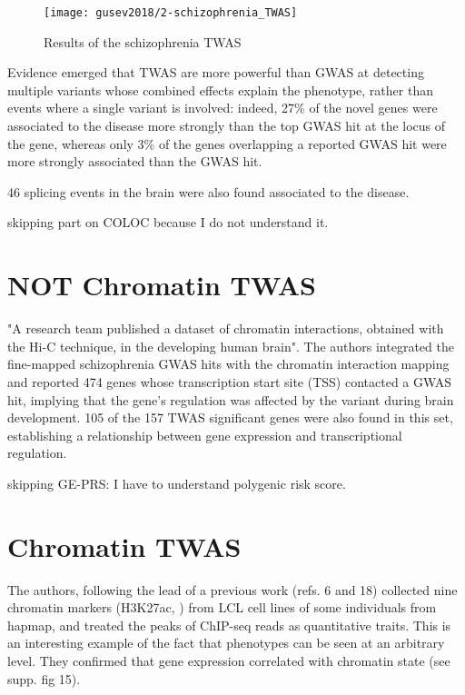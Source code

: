 \documentclass[../main.tex]{subfiles}
\begin{document}
\begin{figure}
	\texttt{[image: gusev2018/2-schizophrenia\_TWAS]}
	\caption{Results of the schizophrenia TWAS}
\end{figure}

Evidence emerged that TWAS are more powerful than GWAS at detecting 
multiple variants whose combined effects explain the phenotype, rather 
than events where a single variant is involved: indeed, 27\% of the 
novel genes were associated to the disease more strongly than the top 
GWAS hit at the locus of the gene, whereas only 3\% of the genes 
overlapping a reported GWAS hit were more strongly associated than the 
GWAS hit.

46 splicing events in the brain were also found associated to the 
   disease.

skipping part on COLOC because I do not understand it.

\section{NOT Chromatin TWAS}

"A research team published a dataset of chromatin interactions, obtained 
with the Hi-C technique, in the developing human brain". The authors 
integrated the fine-mapped schizophrenia GWAS hits with the chromatin 
interaction mapping and reported 474 genes whose transcription start 
site (TSS) contacted a GWAS hit, implying that the gene's regulation was 
affected by the variant during brain development. 105 of the 157 TWAS 
significant genes were also found in this set, establishing a 
relationship between gene expression and transcriptional regulation.

skipping GE-PRS: I have to understand polygenic risk score.

\section{Chromatin TWAS}

The authors, following the lead of a previous work (refs. 6 and 18) 
collected nine chromatin markers (H3K27ac, \etc) from LCL cell lines of 
some individuals from hapmap, and treated the peaks of ChIP-seq reads as 
quantitative traits. This is an interesting example of the fact that 
phenotypes can be seen at an arbitrary level. They confirmed that gene 
expression correlated with chromatin state (see supp. fig 15).
\end{document}
